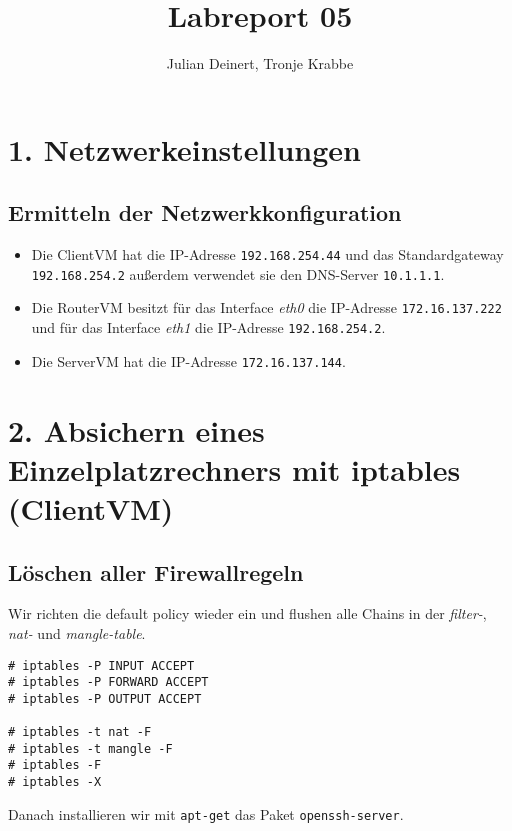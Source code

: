 \documentclass[10pt,a4paper]{article}
\author{Julian Deinert, Tronje Krabbe}
\title{Labreport 05}
\begin{document}
\maketitle
\tableofcontents
\newpage


\section*{1. Netzwerkeinstellungen }
\setcounter{subsection}{1}

\subsection{Ermitteln der Netzwerkkonfiguration}
\begin{itemize}
\item Die ClientVM hat die IP-Adresse \texttt{192.168.254.44} und das Standardgateway \texttt{192.168.254.2} außerdem verwendet sie den DNS-Server \texttt{10.1.1.1}.

\item Die RouterVM besitzt für das Interface \textit{eth0} die IP-Adresse \texttt{172.16.137.222} und für das Interface \textit{eth1} die IP-Adresse \texttt{192.168.254.2}.

\item Die ServerVM hat die IP-Adresse \texttt{172.16.137.144}.
\end{itemize}

\setcounter{section}{2}
\section*{2. Absichern eines Einzelplatzrechners mit iptables (ClientVM)}
\setcounter{subsection}{0}
\subsection{Löschen aller Firewallregeln}

Wir richten die default policy wieder ein und flushen alle Chains  in der \textit{filter-}, \textit{nat-} und \textit{mangle-table}.
\begin{verbatim}
# iptables -P INPUT ACCEPT
# iptables -P FORWARD ACCEPT
# iptables -P OUTPUT ACCEPT

# iptables -t nat -F
# iptables -t mangle -F
# iptables -F
# iptables -X
\end{verbatim}
Danach installieren wir mit \texttt{apt-get} das Paket \texttt{openssh-server}.
\end{document}
